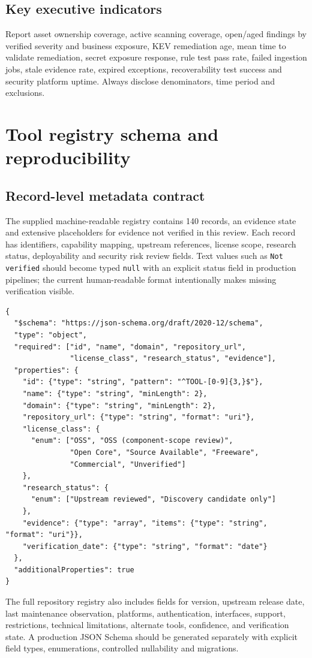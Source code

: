 \documentclass[11pt,oneside]{report}
\begin{document}
\section{Key executive indicators}
Report asset ownership coverage, active scanning coverage, open/aged findings by verified severity and business exposure, KEV remediation age, mean time to validate remediation, secret exposure response, rule test pass rate, failed ingestion jobs, stale evidence rate, expired exceptions, recoverability test success and security platform uptime. Always disclose denominators, time period and exclusions.

\chapter{Tool registry schema and reproducibility}
\section{Record-level metadata contract}
The supplied machine-readable registry contains 140 records, an evidence state and extensive placeholders for evidence not verified in this review. Each record has identifiers, capability mapping, upstream references, license scope, research status, deployability and security risk review fields. Text values such as \texttt{Not verified} should become typed \texttt{null} with an explicit status field in production pipelines; the current human-readable format intentionally makes missing verification visible.

\begin{verbatim}
{
  "$schema": "https://json-schema.org/draft/2020-12/schema",
  "type": "object",
  "required": ["id", "name", "domain", "repository_url",
               "license_class", "research_status", "evidence"],
  "properties": {
    "id": {"type": "string", "pattern": "^TOOL-[0-9]{3,}$"},
    "name": {"type": "string", "minLength": 2},
    "domain": {"type": "string", "minLength": 2},
    "repository_url": {"type": "string", "format": "uri"},
    "license_class": {
      "enum": ["OSS", "OSS (component-scope review)",
               "Open Core", "Source Available", "Freeware",
               "Commercial", "Unverified"]
    },
    "research_status": {
      "enum": ["Upstream reviewed", "Discovery candidate only"]
    },
    "evidence": {"type": "array", "items": {"type": "string", "format": "uri"}},
    "verification_date": {"type": "string", "format": "date"}
  },
  "additionalProperties": true
}
\end{verbatim}
The full repository registry also includes fields for version, upstream release date, last maintenance observation, platforms, authentication, interfaces, support, restrictions, technical limitations, alternate tools, confidence, and verification state. A production JSON Schema should be generated separately with explicit field types, enumerations, controlled nullability and migrations.
\end{document}
